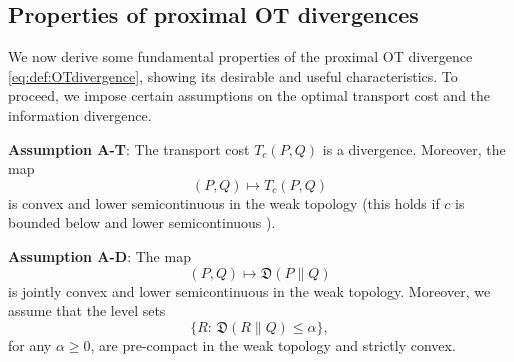 \documentclass{amsart}
\theoremstyle{definition}
\theoremstyle{remark}
\numberwithin{equation}{section}
\begin{document}



\subsection{Properties of proximal OT divergences}
\label{sec:good.divergence}

We now derive some fundamental properties of the proximal OT divergence \eqref{eq:def:OTdivergence}, showing its desirable and useful characteristics. To proceed, we impose certain assumptions on the optimal transport cost and the information divergence.
\medskip

\noindent
{\bf Assumption A-T}:  The transport cost $T_c(P,Q)$ is a divergence. Moreover, the map 
\begin{equation}
(P,Q) \mapsto  T_c(P,Q)
\end{equation}
is convex and lower semicontinuous in the weak topology (this holds if $c$ is bounded below and lower semicontinuous \cite{Santambrogio}). 

\medskip

\noindent
{\bf Assumption A-D}:  The map
\begin{equation}
(P,Q) \mapsto  \mathfrak{D}(P\|Q)
\end{equation}
is jointly convex and lower semicontinuous in the weak topology.  
Moreover, we assume that the level sets
\begin{equation}
\{R:\, \mathfrak{D}(R\|Q) \le \alpha\},
\end{equation}
for any $\alpha\geq 0$, are pre-compact in the weak topology and strictly convex. 
\end{document}
